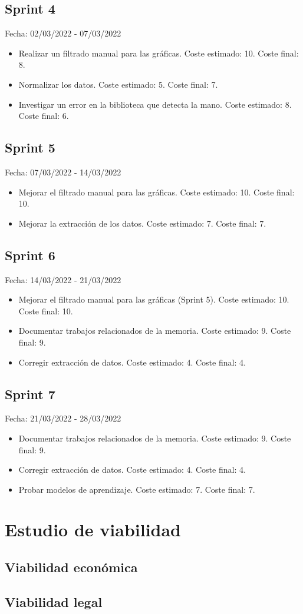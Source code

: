 \subsection{Sprint 4}
Fecha: 02/03/2022 - 07/03/2022
\begin{itemize}
	\item Realizar un filtrado manual para las gráficas. Coste estimado: 10. Coste final: 8. 
	\item Normalizar los datos. Coste estimado: 5. Coste final: 7.
	\item Investigar un error en la biblioteca que detecta la mano. Coste estimado: 8. Coste final: 6.
\end{itemize}

\subsection{Sprint 5}
Fecha: 07/03/2022 - 14/03/2022
\begin{itemize}
	\item Mejorar el filtrado manual para las gráficas. Coste estimado: 10. Coste final: 10.
	\item Mejorar la extracción de los datos. Coste estimado: 7. Coste final: 7.
\end{itemize}

\subsection{Sprint 6}
Fecha: 14/03/2022 - 21/03/2022
\begin{itemize}
	\item Mejorar el filtrado manual para las gráficas (Sprint 5). Coste estimado: 10. Coste final: 10.
	\item Documentar trabajos relacionados de la memoria. Coste estimado: 9. Coste final: 9.
	\item Corregir extracción de datos. Coste estimado: 4. Coste final: 4.
\end{itemize}

\subsection{Sprint 7}
Fecha: 21/03/2022 - 28/03/2022
\begin{itemize}
	\item Documentar trabajos relacionados de la memoria. Coste estimado: 9. Coste final: 9.
	\item Corregir extracción de datos. Coste estimado: 4. Coste final: 4.
	\item Probar modelos de aprendizaje. Coste estimado: 7. Coste final: 7.
\end{itemize}

\section{Estudio de viabilidad}

\subsection{Viabilidad económica}

\subsection{Viabilidad legal}
